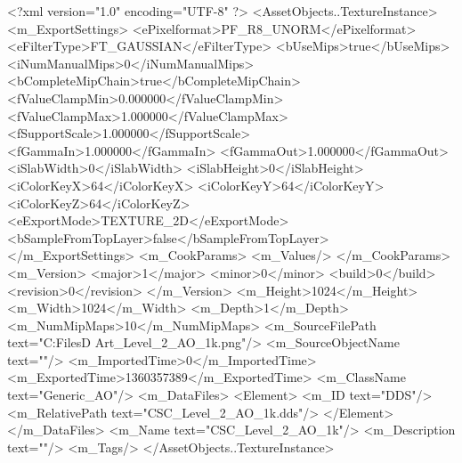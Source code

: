 <?xml version="1.0" encoding="UTF-8" ?>
<AssetObjects..TextureInstance>
	<m_ExportSettings>
		<ePixelformat>PF_R8_UNORM</ePixelformat>
		<eFilterType>FT_GAUSSIAN</eFilterType>
		<bUseMips>true</bUseMips>
		<iNumManualMips>0</iNumManualMips>
		<bCompleteMipChain>true</bCompleteMipChain>
		<fValueClampMin>0.000000</fValueClampMin>
		<fValueClampMax>1.000000</fValueClampMax>
		<fSupportScale>1.000000</fSupportScale>
		<fGammaIn>1.000000</fGammaIn>
		<fGammaOut>1.000000</fGammaOut>
		<iSlabWidth>0</iSlabWidth>
		<iSlabHeight>0</iSlabHeight>
		<iColorKeyX>64</iColorKeyX>
		<iColorKeyY>64</iColorKeyY>
		<iColorKeyZ>64</iColorKeyZ>
		<eExportMode>TEXTURE_2D</eExportMode>
		<bSampleFromTopLayer>false</bSampleFromTopLayer>
	</m_ExportSettings>
	<m_CookParams>
		<m_Values/>
	</m_CookParams>
	<m_Version>
		<major>1</major>
		<minor>0</minor>
		<build>0</build>
		<revision>0</revision>
	</m_Version>
	<m_Height>1024</m_Height>
	<m_Width>1024</m_Width>
	<m_Depth>1</m_Depth>
	<m_NumMipMaps>10</m_NumMipMaps>
	<m_SourceFilePath text="C:\Users\Shadow\Desktop\Working Files\3D Art\CSC_Level_2_AO_1k.png"/>
	<m_SourceObjectName text=""/>
	<m_ImportedTime>0</m_ImportedTime>
	<m_ExportedTime>1360357389</m_ExportedTime>
	<m_ClassName text="Generic_AO"/>
	<m_DataFiles>
		<Element>
			<m_ID text="DDS"/>
			<m_RelativePath text="CSC_Level_2_AO_1k.dds"/>
		</Element>
	</m_DataFiles>
	<m_Name text="CSC_Level_2_AO_1k"/>
	<m_Description text=""/>
	<m_Tags/>
</AssetObjects..TextureInstance>

